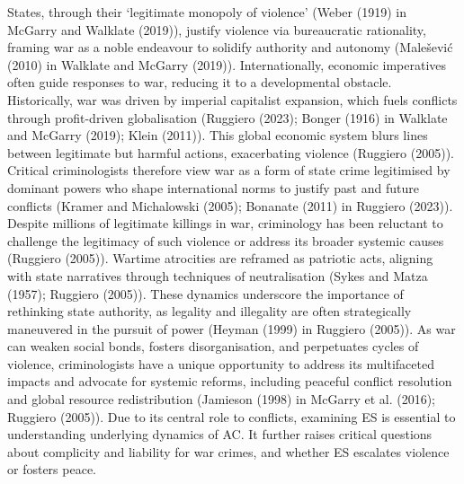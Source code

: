 \documentclass[
]{article}
\begin{document}
States, through their `legitimate monopoly of violence' (Weber (1919) in
McGarry and Walklate (2019)), justify violence via bureaucratic
rationality, framing war as a noble endeavour to solidify authority and
autonomy (Malešević (2010) in Walklate and McGarry (2019)).
Internationally, economic imperatives often guide responses to war,
reducing it to a developmental obstacle. Historically, war was driven by
imperial capitalist expansion, which fuels conflicts through
profit-driven globalisation (Ruggiero (2023); Bonger (1916) in Walklate
and McGarry (2019); Klein (2011)). This global economic system blurs
lines between legitimate but harmful actions, exacerbating violence
(Ruggiero (2005)). Critical criminologists therefore view war as a form
of state crime legitimised by dominant powers who shape international
norms to justify past and future conflicts (Kramer and Michalowski
(2005); Bonanate (2011) in Ruggiero (2023)). Despite millions of
legitimate killings in war, criminology has been reluctant to challenge
the legitimacy of such violence or address its broader systemic causes
(Ruggiero (2005)). Wartime atrocities are reframed as patriotic acts,
aligning with state narratives through techniques of neutralisation
(Sykes and Matza (1957); Ruggiero (2005)). These dynamics underscore the
importance of rethinking state authority, as legality and illegality are
often strategically maneuvered in the pursuit of power (Heyman (1999) in
Ruggiero (2005)). As war can weaken social bonds, fosters
disorganisation, and perpetuates cycles of violence, criminologists have
a unique opportunity to address its multifaceted impacts and advocate
for systemic reforms, including peaceful conflict resolution and global
resource redistribution (Jamieson (1998) in McGarry et al. (2016);
Ruggiero (2005)). Due to its central role to conflicts, examining ES is
essential to understanding underlying dynamics of AC. It further raises
critical questions about complicity and liability for war crimes, and
whether ES escalates violence or fosters peace.
\end{document}
